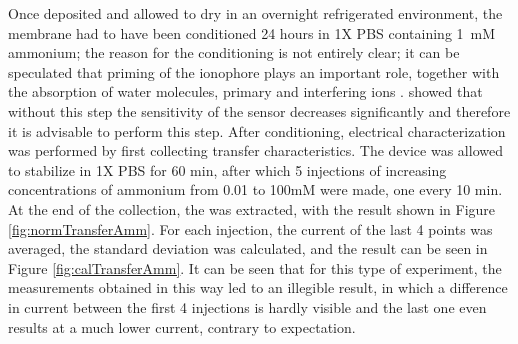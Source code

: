Once deposited and allowed to dry in an overnight refrigerated environment, the membrane had to have been conditioned 24 hours in 1X PBS containing \SI{1}{mM} ammonium; the reason for the conditioning is not entirely clear; it can be speculated that priming of the ionophore plays an important role, together with the absorption of water molecules, primary and interfering ions \citep{petrelliMethod2023}. \citet{petrelliMethod2023} showed that without this step the sensitivity of the sensor decreases significantly and therefore it is advisable to perform this step.
After conditioning, electrical characterization was performed by first collecting transfer characteristics. The device was allowed to stabilize in 1X PBS for 60 min, after which 5 injections of increasing concentrations of ammonium from 0.01 to 100mM were made, one every 10 min. At the end of the collection, the \ion{} was extracted, with the result shown in Figure \ref{fig:normTransferAmm}. For each injection, the current of the last 4 points was averaged, the standard deviation was calculated, and the result can be seen in Figure \ref{fig:calTransferAmm}. It can be seen that for this type of experiment, the measurements obtained in this way led to an illegible result, in which a difference in current between the first 4 injections is hardly visible and the last one even results at a much lower current, contrary to expectation.

